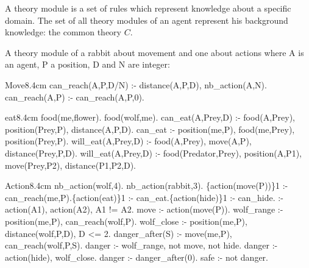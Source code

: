 \documentclass{aamas2012}
\begin{document}
	\begin{definition}
		A theory module is a set of rules which represent knowledge about a specific domain.
		The set of all theory modules of an agent represent his background knowledge: the common theory $C$.
	\end{definition}
	
	\begin{example}
		\label{theory_example}
		
		A theory module of a rabbit about movement and one about actions where A is an agent, P a position, D and N are integer:\newline
		\begin{module}{Move}{8.4cm}
			can\_reach(A,P,D/N) :- distance(A,P,D), nb\_action(A,N).\newline
			can\_reach(A,P) :- can\_reach(A,P,0).
		\end{module}
		
		\begin{module}{eat}{8.4cm}
			food(me,flower).\newline
			food(wolf,me).\newline
			\newline
			can\_eat(A,Prey,D) :- food(A,Prey), position(Prey,P), distance(A,P,D).\newline
			can\_eat :- position(me,P), food(me,Prey), position(Prey,P).\newline
			\newline
			will\_eat(A,Prey,D) :- food(A,Prey), move(A,P), distance(Prey,P,D).\newline
			will\_eat(A,Prey,D) :- food(Predator,Prey), position(A,P1), move(Prey,P2), distance(P1,P2,D).\newline
		\end{module}
		
		\begin{module}{Action}{8.4cm}
			nb\_action(wolf,4).\newline
			nb\_action(rabbit,3).\newline
			\{action(move(P))\}1 :- can\_reach(me,P).\{action(eat)\}1 :- can\_eat.\{action(hide)\}1 :- can\_hide.\newline
			:- action(A1), action(A2), A1 != A2.\newline
			\newline
			move :- action(move(P)).\newline
			wolf\_range :- position(me,P), can\_reach(wolf,P).\newline
			wolf\_close :- position(me,P), distance(wolf,P,D), D <= 2.\newline
			\newline
			danger\_after(S) :- move(me,P), can\_reach(wolf,P,S).\newline
			danger :- wolf\_range, not move, not hide.\newline
			danger :- action(hide), wolf\_close.\newline
			danger :- danger\_after(0).\newline
			safe :- not danger.
		\end{module}
		

\end{example}
\end{document}
